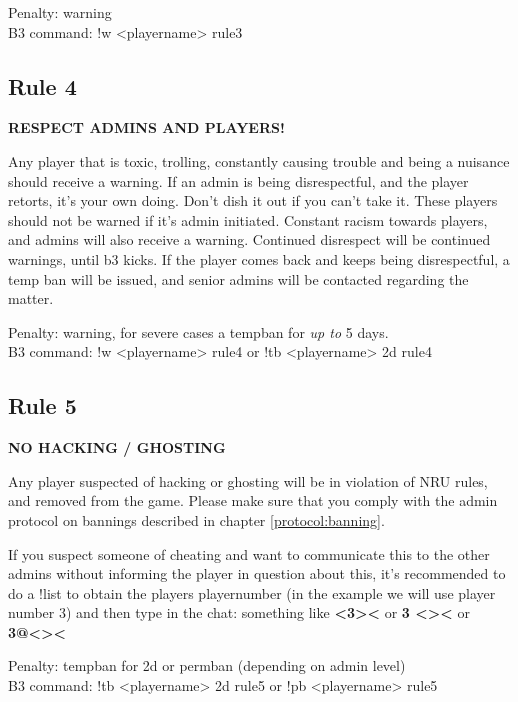 \begin{addmargin}[2em]{4em}
Penalty: warning \\
B3 command: !w <playername> rule3
\end{addmargin}

\subsection*{Rule 4}
\label{rules:sd:4}
\textbf{RESPECT ADMINS AND PLAYERS!}

Any player that is toxic, trolling, constantly causing trouble and being a nuisance should receive a warning. If an admin is being disrespectful, and the player retorts, it's your own doing. Don't dish it out if you can't take it. These players should not be warned if it's admin initiated. Constant racism towards players, and admins will also receive a warning. Continued disrespect will be continued warnings, until b3 kicks. If the player comes back and keeps being disrespectful, a temp ban will be issued, and senior admins will be contacted regarding the matter.

\begin{addmargin}[2em]{4em}
Penalty: warning, for severe cases a tempban for \textit{up to} 5 days.\\
B3 command: !w <playername> rule4 or !tb <playername> 2d rule4
\end{addmargin}

\subsection*{Rule 5}
\label{rules:sd:5}
\textbf{NO HACKING / GHOSTING}

Any player suspected of hacking or ghosting will be in violation of NRU rules, and removed from the game. Please make sure that you comply with the admin protocol on bannings described in chapter \ref{protocol:banning}.

If you suspect someone of cheating and want to communicate this to the other admins without informing the player in question about this, it's recommended to do a !list to obtain the players playernumber (in the example we will use player number 3) and then type in the chat: something like \textbf{<3><} or \textbf{3 <><}  or \textbf{3@<><}

\begin{addmargin}[2em]{4em}
Penalty: tempban for 2d or permban (depending on admin level)\\
B3 command: !tb <playername> 2d rule5 or !pb <playername> rule5
\end{addmargin}

